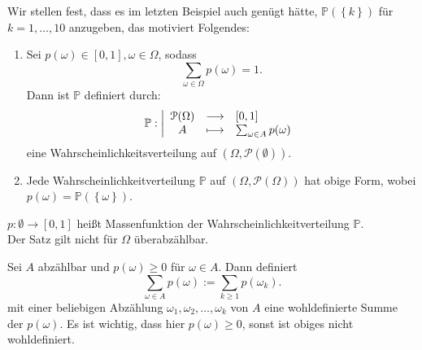 Wir stellen fest, dass es im letzten Beispiel auch genügt hätte, $\mathbb{P}(\left \{k\right\} )$ für $k=1,\ldots,10$ anzugeben, das motiviert Folgendes:
\begin{theorem}\label{thm:wahrscheinlichkeitsverteilungen-auf-abzaehlbaren-raeumen}
    \begin{enumerate}[label=\protect\circled{\alph*}]
        Sei $\Omega$ abzählbar.
        \item Sei $p(\omega)\in [0,1], \omega\in \Omega$, sodass
            \[
                \sum_{\omega\in \Omega}p(\omega) = 1
            .\] 
            Dann ist $\mathbb{P}$ definiert durch:
                \begin{equation*}
                \mathbb{P}: \left| \begin{array}{c c l} 
                    \mathcal{P}(\Omega) & \longrightarrow & [0,1] \\
                    A & \longmapsto &  \sum_{\omega\in A}p(\omega)
                \end{array} \right.
            \end{equation*}
            eine Wahrscheinlichkeitsverteilung auf $(\Omega,\mathcal{P}(\emptyset))$. 
        \item Jede Wahrscheinlichkeitverteilung $\mathbb{P}$ auf $(\Omega,\mathcal{P}(\Omega))$ hat obige Form, wobei $p(\omega) = \mathbb{P}(\left \{\omega\right\} )$.
    \end{enumerate}
\end{theorem}

\begin{remark}
    $p:\emptyset\to [0,1]$ heißt Massenfunktion der Wahrscheinlichkeitverteilung $\mathbb{P}$. \\
    \warning Der Satz gilt nicht für $\Omega$ überabzählbar.
\end{remark}


\begin{remark}
    Sei $A$ abzählbar und  $p(\omega) \geq 0$ für $\omega\in A$. Dann definiert
    \[
        \sum_{\omega\in A} p(\omega) := \sum_{k\geq 1} p(\omega_k)
    .\] 
    mit einer beliebigen Abzählung $\omega_1,\omega_2, \ldots, \omega_k$ von $A$ eine wohldefinierte Summe der  $p(\omega)$. Es ist wichtig, dass hier $p(\omega) \geq 0$, sonst ist obiges nicht wohldefiniert.
\end{remark}

